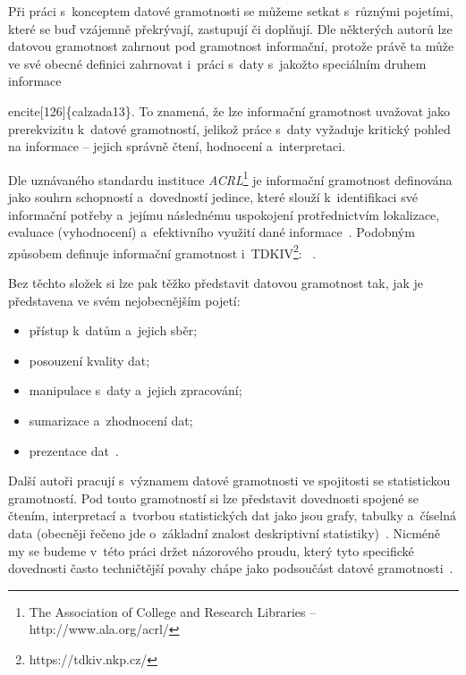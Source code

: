 Při práci s~konceptem datové gramotnosti se můžeme setkat s~různými pojetími, které se buď vzájemně překrývají, zastupují či doplňují. Dle některých autorů lze datovou gramotnost zahrnout pod gramotnost informační, protože právě ta může ve své obecné definici zahrnovat i~práci s~daty s~jakožto speciálním druhem informace

\par

encite{[}126{]}\{calzada13\}. To znamená, že lze informační gramotnost uvažovat jako prerekvizitu k~datové gramotností, jelikož práce s~daty vyžaduje kritický pohled na informace -- jejich správně čtení, hodnocení a~interpretaci.

Dle uznávaného standardu instituce \emph{ACRL}\footnote{The Association of College and Research Libraries – http://www.ala.org/acrl/} je informační gramotnost definována jako souhrn schopností a~dovedností jedince, které slouží k~identifikaci své informační potřeby a~jejímu následnému uspokojení protřednictvím lokalizace, evaluace (vyhodnocení) a~efektivního využití dané informace~\parencite[2]{acrl14}. Podobným způsobem definuje informační gramotnost i~TDKIV\footnote{https://tdkiv.nkp.cz/}: ~\parencite{tdkiv03}.

Bez těchto složek si lze pak těžko představit datovou gramotnost tak, jak je představena ve svém nejobecnějším pojetí:

\begin{itemize}
\tightlist
\item
  přístup k~datům a~jejich sběr;
\item
  posouzení kvality dat;
\item
  manipulace s~daty a~jejich zpracování;
\item
  sumarizace a~zhodnocení dat;
\item
  prezentace dat~\parencite[8]{schield05}.
\end{itemize}

Další autoři pracují s~významem datové gramotnosti ve spojitosti se statistickou gramotností. Pod touto gramotností si lze představit dovednosti spojené se čtením, interpretací a~tvorbou statistických dat jako jsou grafy, tabulky a~číselná data (obecněji řečeno jde o~základní znalost deskriptivní statistiky)~\parencite[8]{schield05}. Nicméně my se budeme v~této práci držet názorového proudu, který tyto specifické dovednosti často techničtější povahy chápe jako podsoučást datové gramotnosti~\parencite[125]{calzada13}.

